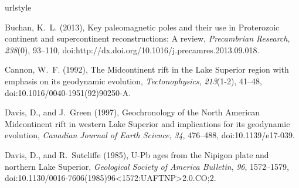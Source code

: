 \documentclass[draft,gc]{AGUTeX}
\begin{document}
\begin{article}
%
%
%
%
%
%
%
%
%

%

\begin{thebibliography}{24}
\providecommand{\natexlab}[1]{#1}
\expandafter\ifx\csname urlstyle\endcsname\relax
  \providecommand{\doi}[1]{doi:\discretionary{}{}{}#1}\else
  \providecommand{\doi}{doi:\discretionary{}{}{}\begingroup
  \urlstyle{rm}\Url}\fi

Buchan, K.~L. (2013), Key paleomagnetic poles and their use in Proterozoic
  continent and supercontinent reconstructions: A review, \textit{Precambrian
  Research}, \textit{238}(0), 93--110,
  \doi{http://dx.doi.org/10.1016/j.precamres.2013.09.018}.

Cannon, W.~F. (1992), The {Midcontinent rift in the Lake Superior} region with
  emphasis on its geodynamic evolution, \textit{Tectonophysics},
  \textit{213}(1-2), 41--48, \doi{10.1016/0040-1951(92)90250-A}.

Davis, D., and J.~Green (1997), Geochronology of the {N}orth {A}merican
  {M}idcontinent rift in western {L}ake {S}uperior and implications for its geodynamic evolution, \textit{Canadian Journal of Earth Science},
  \textit{34}, 476--488, \doi{10.1139/e17-039}.

Davis, D., and R.~Sutcliffe (1985), {U}-{P}b ages from the {N}ipigon plate and
  northern {L}ake {S}uperior, \textit{Geological Society of America Bulletin},
  \textit{96}, 1572--1579,
  \doi{10.1130/0016-7606(1985)96<1572:UAFTNP>2.0.CO;2}.
  

\end{thebibliography}
\end{article}
\end{document}
